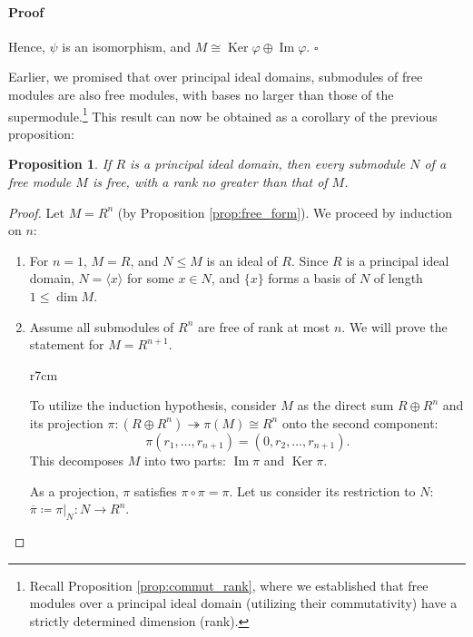 \documentclass{article}
\newif\ifusemulticols
\newif\ifmobileview
\theoremstyle{definition}
\theoremstyle{remark}
\theoremstyle{plain}
\theoremstyle{plain}
\newtheorem{prop}[theorem]{Proposition}
\newenvironment{mymulticols}
    { \ifusemulticols \begin{multicols}{2} \fi }
    { \ifusemulticols \end{multicols} \fi }
\newcommand\mywrapbegin[3]{\ifmobileview\else\begin{wrapfigure}[#1]{#2}{#3}\fi}
\newcommand\mywrapend{\ifmobileview\else\end{wrapfigure}\fi}
\newenvironment{myproof}{\paragraph{Proof}}{\hfill$\square$}
\DeclareMathOperator{\Ker}{Ker}
\DeclareMathOperator{\image}{Im}
\begin{document}
\begin{mymulticols}
\begin{myproof}
    Hence, $\psi$ is an isomorphism, and $M \cong \Ker \varphi \oplus \image \varphi$.
\end{myproof}

Earlier, we promised that over principal ideal domains, submodules of free modules are also free modules, with bases no larger than those of the supermodule.\footnote{Recall Proposition \ref{prop:commut_rank}, where we established that free modules over a principal ideal domain (utilizing their commutativity) have a strictly determined dimension (rank).} 
This result can now be obtained as a corollary of the previous proposition:

\begin{prop}
    \label{prop:free_sub}
    If $R$ is a principal ideal domain, then every submodule $N$ of a free module $M$ is free, with
    a rank no greater than that of $M$.
\end{prop}

\begin{proof}
    Let $M = R^n$ (by Proposition \ref{prop:free_form}). We proceed by induction on $n$:
    \begin{enumerate}
        \item For $n = 1$, $M = R$, and $N \le M$ is an ideal of $R$. Since $R$ is a principal ideal
            domain, $N = \langle x \rangle$ for some $x \in N$, and $\{x\}$ forms a basis of $N$ of
            length $1 \le \dim M$.
        \item 
            Assume all submodules of $R^n$ are free of rank at most $n$. 
            We will prove the statement for $M = R^{n+1}$.

            \begin{minipage}{\linewidth}
                \mywrapbegin{11}{r}{7cm}
                \mywrapend

                To utilize the induction hypothesis, consider $M$ as the direct sum $R \oplus R^n$
                and its projection $\pi: (R \oplus R^n) \twoheadrightarrow \pi(M) \cong R^n$ onto
                the second component: $$\pi(r_1, \ldots, r_{n+1}) = \left(0, r_2, \ldots, r_{n+1}\right).$$
                This decomposes $M$ into two parts: $\image \pi$ and $\Ker \pi$.

                As a projection, $\pi$ satisfies $\pi \circ \pi = \pi$. Let us consider its
                restriction to $N$: $\overline{\pi} \coloneqq \pi|_N : N \to R^n$.
            \end{minipage}


\end{enumerate}
\end{proof}
\end{mymulticols}
\end{document}
